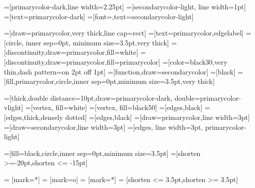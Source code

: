 =[primarycolor-dark,line width=2.25pt]
=[secondarycolor-light, line width=1pt]
=[text=primarycolor-dark]
=[font=\footnotesize,text=secondarycolor-light]

=[draw=primarycolor,very thick,line cap=rect]
=[text=primarycolor,edgelabel]
=[circle, inner sep=0pt, minimum size=3.5pt,very thick]
=[discontinuity,draw=primarycolor,fill=white]
=[discontinuity,draw=primarycolor,fill=primarycolor]
=[color=black30,very thin,dash pattern=on 2pt off 1pt]
=[function,draw=secondarycolor]
=[black]
=[fill,primarycolor,circle,inner sep=0pt,minimum size=3.5pt,very thick]

=[thick,double distance=10pt,draw=primarycolor-dark, double=primarycolor-vlight]
=[vertex, fill=white]
=[vertex, fill=black50]
=[edges,black]
=[edges,thick,densely dotted]
=[edges,black]
=[draw=primarycolor,line width=3pt]
=[draw=secondarycolor,line width=3pt]
=[edges, line width=3pt, primarycolor-light]

=[fill=black,circle,inner sep=0pt,minimum size=3.5pt]
=[shorten >=-20pt,shorten <= -15pt]

 = [mark=*]
 = [mark=o]
 = [mark=*]
 = [shorten <= 3.5pt,shorten >= 3.5pt]



